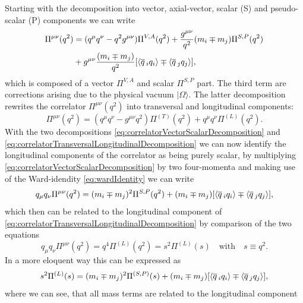 \documentclass[../../index.tex]{subfiles}
\begin{document}
Starting with the decomposition into vector, axial-vector, scalar (S) and pseudo-scalar (P) components we can
write \cite{Broadhurst1981,Jamin1992}
\begin{equation}
  \label{eq:correlatorVectorScalarDecomposition}
  \begin{split}
    \Pi^{\mu\nu}(q^2) &= (q^\mu q^\nu - q^2 g^{\mu\nu}) \Pi^{V,A}(q^2) + \frac{g^{\mu\nu}}{q^2} (m_i \mp m_j)\Pi^{S,P}(q^2) \\
    &+ g^{\mu\nu}\frac{(m_i \mp m_j)}{q^2} [ \langle \overline{q}\,_i q_i \rangle \mp \langle \overline{q}\,_j q_j \rangle],
  \end{split}
\end{equation}
which is composed of a vector $\Pi^{V,A}$ and scalar $\Pi^{S,P}$ part. The third
term are corrections arising due to the physical vacuum $|\Omega\rangle$. The
latter decomposition rewrites the correlator $\Pi^{\mu\nu}(q^2)$ into transversal
and longitudinal components:
\begin{equation}
  \label{eq:correlatorTransversalLongitudinalDecomposition}
  \Pi^{\mu\nu}(q^2) = (q^\mu q^\nu - g^{\mu\nu}q^2) \Pi^{(T)}(q^2) + q^\mu q^\nu \Pi^{(L)}(q^2).
\end{equation}
With the two decompositions \cref{eq:correlatorVectorScalarDecomposition} and
\cref{eq:correlatorTransversalLongitudinalDecomposition} we can now identify the
longitudinal components of the correlator as being purely scalar, by multiplying
\cref{eq:correlatorVectorScalarDecomposition} by two four-momenta and making use
of the Ward-idendity \cref{eq:wardIdentity} we can write
\begin{equation}
  q_\mu q_\nu \Pi^{\mu\nu}(q^2) = (m_i \mp m_j)^2 \Pi^{S,P}(q^2) + (m_i \mp m_j)[\langle \overline{q}\,_i q_i \rangle \mp \langle \overline{q}\,_j q_j \rangle],
\end{equation}
which then can be related to the longitudinal component of
\cref{eq:correlatorTransversalLongitudinalDecomposition} by comparison of the
two equations
\begin{equation}
  q_\mu q_\nu \Pi^{\mu\nu}(q^2) = q^4 \Pi^{(L)}(q^2) = s^2 \Pi^{(L)}(s) \quad \text{with} \quad s\equiv q^2.
\end{equation}
In a more eloquent way this can be expressed as
\begin{equation}
  s^2 \Pi^{(L)}(s) = (m_i \mp m_j)^2 \Pi^{(S,P)}(s) + (m_i \mp m_j)[ \langle \overline{q}\,_i q_i \rangle \mp \langle \overline{q}\,_j q_j \rangle],
\end{equation}
where we can see, that all mass terms are related to the longitudinal component
\end{document}
